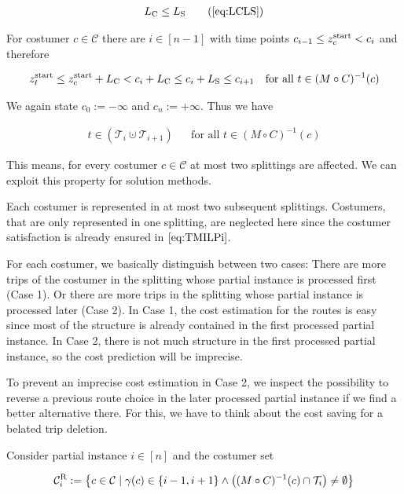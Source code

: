 \begin{align*}
	L_{\operatorname{C}}\leq L_{\operatorname{S}} \tag{\ref{eq:LCLS}}
\end{align*}

For costumer $c\in\mathcal{C}$ there are $i\in[n-1]$ with time points $c_{i-1}\leq z^{\operatorname{start}}_c < c_i$ and therefore

\begin{align*}
	z^{\operatorname{start}}_t \leq z^{\operatorname{start}}_c + L_{\operatorname{C}} < c_i + L_{\operatorname{C}} \leq c_i + L_{\operatorname{S}} \leq c_{i+1} && \text{for all } t\in (M\circ C)^{-1}(c)
\end{align*}

We again state $c_{0}:=-\infty$ and $c_n:=+\infty$. Thus we have

\begin{align*}
	t\in\left(\mathcal{T}_i\cupdot\mathcal{T}_{i+1}\right) && \text{for all } t\in (M\circ C)^{-1}(c)
\end{align*}

This means, for every costumer $c\in\mathcal{C}$ at most two splittings are affected. We can exploit this property for solution methods.

Each costumer is represented in at most two subsequent splittings. Costumers, that are only represented in one splitting, are neglected here since the costumer satisfaction is already ensured in $\eqref{eq:TMILPi}$.

For each costumer, we basically distinguish between two cases: There are more trips of the costumer in the splitting whose partial instance is processed first (Case 1). Or there are more trips in the splitting whose partial instance is processed later (Case 2). In Case 1, the cost estimation for the routes is easy since most of the structure is already contained in the first processed partial instance. In Case 2, there is not much structure in the first processed partial instance, so the cost prediction will be imprecise.

To prevent an imprecise cost estimation in Case 2, we inspect the possibility to reverse a previous route choice in the later processed partial instance if we find a better alternative there. For this, we have to think about the cost saving for a belated trip deletion.

Consider partial instance $i\in[n]$ and the costumer set

\begin{align*}
	\mathcal{C}^{\operatorname{R}}_i := \left\{c\in\mathcal{C}\mid\gamma(c)\in\left\{i-1,i+1\right\}\land\left((M\circ C)^{-1}(c)\cap\mathcal{T}_i\right)\neq\emptyset\right\}
\end{align*}

